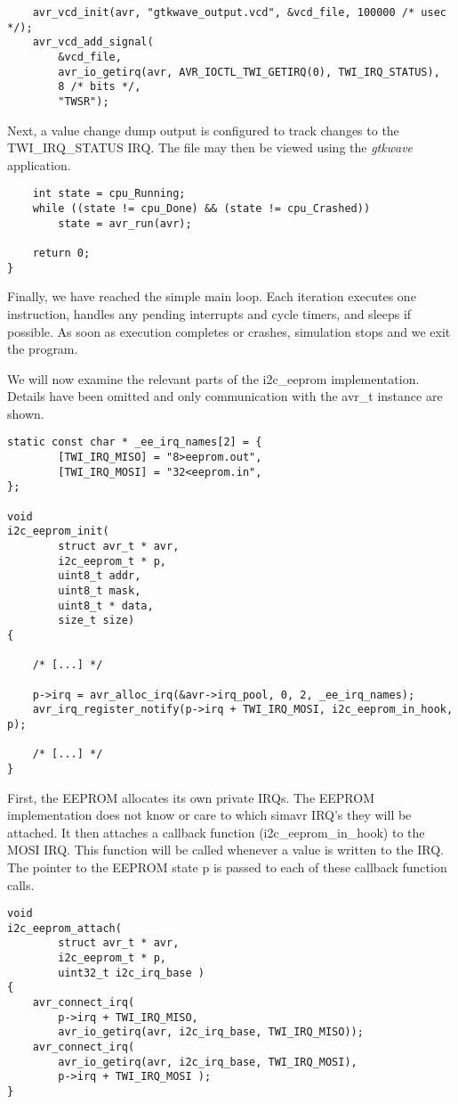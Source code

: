 \begin{lstlisting}
    avr_vcd_init(avr, "gtkwave_output.vcd", &vcd_file, 100000 /* usec */);
    avr_vcd_add_signal(
        &vcd_file,
        avr_io_getirq(avr, AVR_IOCTL_TWI_GETIRQ(0), TWI_IRQ_STATUS),
        8 /* bits */,
        "TWSR");
\end{lstlisting}

Next, a value change dump output is configured to track changes to the
TWI\_IRQ\_STATUS IRQ. The file may then be viewed using the \emph{gtkwave}
application.

\begin{lstlisting}
    int state = cpu_Running;
    while ((state != cpu_Done) && (state != cpu_Crashed))
        state = avr_run(avr);

    return 0;
}
\end{lstlisting}

Finally, we have reached the simple main loop. Each iteration executes one
instruction, handles any pending interrupts and cycle timers, and sleeps if
possible. As soon as execution completes or crashes, simulation stops and we
exit the program.

We will now examine the relevant parts of the i2c\_eeprom implementation.
Details have been omitted and only communication with the avr\_t instance are
shown.

\begin{lstlisting}
static const char * _ee_irq_names[2] = {
		[TWI_IRQ_MISO] = "8>eeprom.out",
		[TWI_IRQ_MOSI] = "32<eeprom.in",
};

void
i2c_eeprom_init(
		struct avr_t * avr,
		i2c_eeprom_t * p,
		uint8_t addr,
		uint8_t mask,
		uint8_t * data,
		size_t size)
{

    /* [...] */

	p->irq = avr_alloc_irq(&avr->irq_pool, 0, 2, _ee_irq_names);
	avr_irq_register_notify(p->irq + TWI_IRQ_MOSI, i2c_eeprom_in_hook, p);

    /* [...] */
}
\end{lstlisting}

First, the EEPROM allocates its own private IRQs. The EEPROM implementation
does not know or care to which simavr IRQ's they will be attached. It then
attaches a callback function (i2c\_eeprom\_in\_hook) to the MOSI IRQ. This
function will be called whenever a value is written to the IRQ. The pointer to
the EEPROM state p is passed to each of these callback function calls.

\begin{lstlisting}
void
i2c_eeprom_attach(
		struct avr_t * avr,
		i2c_eeprom_t * p,
		uint32_t i2c_irq_base )
{
	avr_connect_irq(
		p->irq + TWI_IRQ_MISO,
		avr_io_getirq(avr, i2c_irq_base, TWI_IRQ_MISO));
	avr_connect_irq(
		avr_io_getirq(avr, i2c_irq_base, TWI_IRQ_MOSI),
		p->irq + TWI_IRQ_MOSI );
}
\end{lstlisting}

